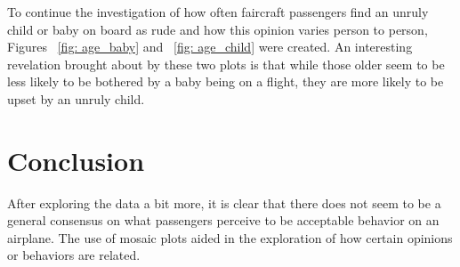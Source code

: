 \documentclass[DIV=calc, paper=a4, fontsize=10pt, twocolumn]{scrartcl}	 %
\begin{document}
\par To continue the investigation of how often faircraft passengers find an unruly child or baby on board as rude and how this opinion varies person to person, Figures ~\ref{fig: age_baby} and ~\ref{fig: age_child} were created. An interesting revelation brought about by these two plots is that while those older seem to be less likely to be bothered by a baby being on a flight, they are more likely to be upset by an unruly child.

\section*{Conclusion}


\par After exploring the data a bit more, it is clear that there does not seem to be a general consensus on what passengers perceive to be acceptable behavior on an airplane. The use of mosaic plots aided in the exploration of how certain opinions or behaviors are related.



\end{document}
